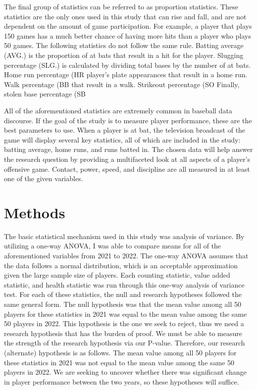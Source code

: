 \documentclass[10pt]{article}
\begin{document}
The final group of statistics can be referred to as proportion statistics. These statistics are the only ones used in this 
study that can rise and fall, and are not dependent on the amount of game participation. For example, a player that plays 150 
games has a much better chance of having more hits than a player who plays 50 games. The following statistics do not follow 
the same rule. Batting average (AVG.) is the proportion of at bats that result in a hit for the player. Slugging percentage 
(SLG.) is calculated by dividing total bases by the number of at bats. Home run percentage (HR%
player’s plate appearances that result in a home run. Walk percentage (BB%
that result in a walk. Strikeout percentage (SO%
Finally, stolen base percentage (SB%

All of the aforementioned statistics are extremely common in baseball data discourse. If the goal of the study is to measure 
player performance, these are the best parameters to use. When a player is at bat, the television broadcast of the game will 
display several key statistics, all of which are included in the study: batting average, home runs, and runs batted in. The 
chosen data will help answer the research question by providing a multifaceted look at all aspects of a player’s offensive 
game. Contact, power, speed, and discipline are all measured in at least one of the given variables.

\section{Methods}

The basic statistical mechanism used in this study was analysis of variance. By utilizing a one-way ANOVA, I was able to 
compare means for all of the aforementioned variables from 2021 to 2022. The one-way ANOVA assumes that the data follows a 
normal distribution, which is an acceptable approximation given the large sample size of players. Each counting statistic, 
value added statistic, and health statistic was run through this one-way analysis of variance test. For each of these 
statistics, the null and research hypotheses followed the same general form. The null hypothesis was that the mean value 
among all 50 players for these statistics in 2021 was equal to the mean value among the same 50 players in 2022. This 
hypothesis is the one we seek to reject, thus we need a research hypothesis that has the burden of proof. We must be able 
to measure the strength of the research hypothesis via our P-value. Therefore, our research (alternate) hypothesis is as 
follows. The mean value among all 50 players for these statistics in 2021 was not equal to the mean value among the same 50 
players in 2022. We are seeking to uncover whether there was significant change in player performance between the two years, 
so these hypotheses will suffice. 
\end{document}
